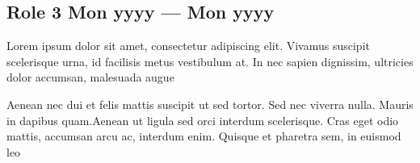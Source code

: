 \subsection*{Role 3 \hfill Mon yyyy --- Mon yyyy} 
    \begin{zitemize}
        \item Lorem ipsum dolor sit amet, consectetur adipiscing elit. Vivamus suscipit scelerisque urna, id facilisis metus vestibulum at. In nec sapien dignissim, ultricies dolor accumsan, malesuada augue 
        \item Aenean nec dui et felis mattis suscipit ut sed tortor. Sed nec viverra nulla. Mauris in dapibus quam.Aenean ut ligula sed orci interdum scelerisque. Cras eget odio mattis, accumsan arcu ac, interdum enim. Quisque et pharetra sem, in euismod leo 
    \end{zitemize}